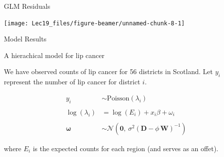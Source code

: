 \documentclass[11pt,ignorenonframetext,]{beamer}
\newenvironment{Shaded}{}{}
\newcommand{\CommentTok}[1]{\textcolor[rgb]{0.38,0.63,0.69}{\textit{#1}}}
\newcommand{\DecValTok}[1]{\textcolor[rgb]{0.25,0.63,0.44}{#1}}
\newcommand{\KeywordTok}[1]{\textcolor[rgb]{0.00,0.44,0.13}{\textbf{#1}}}
\newcommand{\NormalTok}[1]{#1}
\newcommand{\OperatorTok}[1]{\textcolor[rgb]{0.40,0.40,0.40}{#1}}
\newcommand{\StringTok}[1]{\textcolor[rgb]{0.25,0.44,0.63}{#1}}
\let\oldShaded\Shaded
\let\endoldShaded\endShaded
\renewenvironment{Shaded}{\footnotesize\begin{spacing}{0.9}\oldShaded}{\endoldShaded\end{spacing}}
\begin{document}
\begin{frame}{GLM Residuals}
\protect\hypertarget{glm-residuals}{}

\begin{center}\texttt{[image: Lec19\_files/figure-beamer/unnamed-chunk-8-1]} \end{center}

\end{frame}

\begin{frame}[fragile]{Model Results}
\protect\hypertarget{model-results}{}

\begin{Shaded}
\end{Shaded}

\end{frame}

\begin{frame}[t]{A hierachical model for lip cancer}
\protect\hypertarget{a-hierachical-model-for-lip-cancer}{}

We have observed counts of lip cancer for 56 districts in Scotland. Let
\(y_i\) represent the number of lip cancer for district \(i\).

\[\begin{aligned}
y_i &\sim \text{Poisson}(\lambda_i) \\
\\
\log(\lambda_i) &= \log(E_i) + x_i \beta + \omega_i \\
\\
\symbf{\omega} &\sim \mathcal{N}(\symbf{0},~\sigma^2(\symbf{D}-\phi\,\symbf{W})^{-1})
\end{aligned}\]

where \(E_i\) is the expected counts for each region (and serves as an
offet).

\end{frame}
\end{document}
